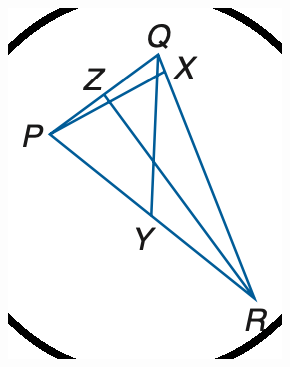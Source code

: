 \documentclass[12pt]{article}
\begin{document}
\begin{center}
\begin{minipage}{0.32\textwidth}
\includegraphics[width=0.95\linewidth]{out_rommath_origin/items/geo231-origin/assets/figure_circle.png}
\end{minipage}
\par
\end{center}
\bigskip
\end{document}
